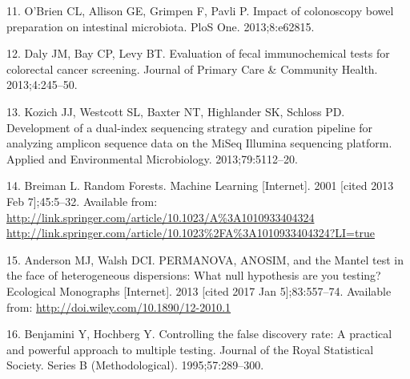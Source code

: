 \documentclass[12pt,]{article}
\begin{document}
\hypertarget{ref-obrien_impact_2013}{}
11. O'Brien CL, Allison GE, Grimpen F, Pavli P. Impact of colonoscopy
bowel preparation on intestinal microbiota. PloS One. 2013;8:e62815.

\hypertarget{ref-daly_evaluation_2013}{}
12. Daly JM, Bay CP, Levy BT. Evaluation of fecal immunochemical tests
for colorectal cancer screening. Journal of Primary Care \& Community
Health. 2013;4:245--50.

\hypertarget{ref-kozich_development_2013}{}
13. Kozich JJ, Westcott SL, Baxter NT, Highlander SK, Schloss PD.
Development of a dual-index sequencing strategy and curation pipeline
for analyzing amplicon sequence data on the MiSeq Illumina sequencing
platform. Applied and Environmental Microbiology. 2013;79:5112--20.

\hypertarget{ref-breiman_random_2001}{}
14. Breiman L. Random Forests. Machine Learning {[}Internet{]}. 2001
{[}cited 2013 Feb 7{]};45:5--32. Available from:
\href{http://link.springer.com/article/10.1023/A\%3A1010933404324\%20http://link.springer.com/article/10.1023\%2FA\%3A1010933404324?LI=true}{http://link.springer.com/article/10.1023/A\%3A1010933404324 http://link.springer.com/article/10.1023\%2FA\%3A1010933404324?LI=true}

\hypertarget{ref-anderson_permanova_2013}{}
15. Anderson MJ, Walsh DCI. PERMANOVA, ANOSIM, and the Mantel test in
the face of heterogeneous dispersions: What null hypothesis are you
testing? Ecological Monographs {[}Internet{]}. 2013 {[}cited 2017 Jan
5{]};83:557--74. Available from:
\url{http://doi.wiley.com/10.1890/12-2010.1}

\hypertarget{ref-benjamini_controlling_1995}{}
16. Benjamini Y, Hochberg Y. Controlling the false discovery rate: A
practical and powerful approach to multiple testing. Journal of the
Royal Statistical Society. Series B (Methodological). 1995;57:289--300.
\end{document}
